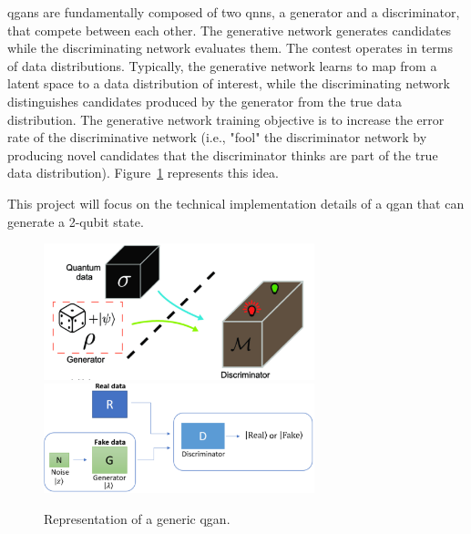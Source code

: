 \glspl{qgan} are fundamentally composed of two \glspl{qnn}, a generator and a 
discriminator, that compete between each other. The generative network generates
candidates while the discriminating network evaluates them. The contest operates
in terms of data distributions. Typically, the generative network learns to map 
from a latent space to a data distribution of interest, while the discriminating
network distinguishes candidates produced by the generator from the true data 
distribution. The generative network training objective is to increase the error
rate of the discriminative network (i.e., "fool" the discriminator network by 
producing novel candidates that the discriminator thinks are part of the true 
data distribution). Figure~\ref{fig:qgan_generic} represents this idea.

This project will focus on the technical implementation details of a \gls{qgan} 
that can generate a 2-qubit state.

\begin{figure}[!htbp]
\centering
	\includegraphics[width=0.70\textwidth]{figures/qgan_generic.pdf} \\
	\includegraphics[width=0.70\textwidth]{figures/qgan_generic2.pdf}
\caption{Representation of a generic \gls{qgan}.}
\label{fig:qgan_generic}
\end{figure}